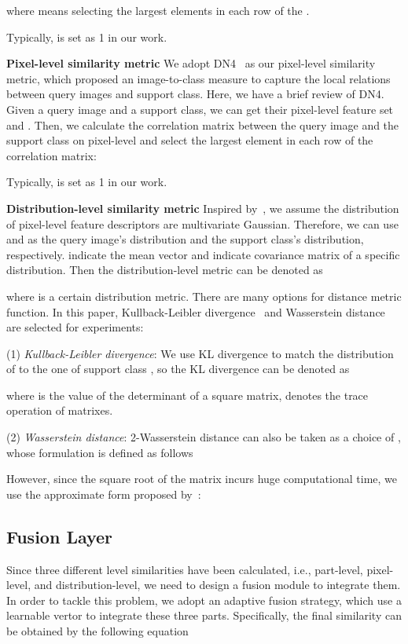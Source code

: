 \documentclass[10pt,twocolumn,letterpaper]{article}
\begin{document}
where  means selecting the  largest elements in each row of the .

Typically,  is set as 1 in our work.

\textbf{Pixel-level similarity metric}
We adopt DN4~\cite{li2019revisiting} as our pixel-level similarity metric, which proposed an image-to-class measure to capture the local relations between query images and support class. Here, we have a brief review of DN4. Given a query image and a support class, we can get their pixel-level feature set  and . Then, we calculate the correlation matrix   between the query image and the support class on pixel-level and select the  largest element in each row of the correlation matrix:

Typically,  is set as 1 in our work.

\textbf{Distribution-level similarity metric}
Inspired by~\cite{li2019distribution,ADM}, we assume the distribution of pixel-level feature descriptors are multivariate Gaussian. Therefore, we can use  and  as the query image's distribution and the support class's distribution, respectively.
 indicate the mean vector and  indicate covariance matrix of a specific distribution. Then the distribution-level metric can be denoted as

where  is a certain distribution metric. There are many options for distance metric function. In this paper, Kullback-Leibler divergence~\cite{Kullback51klDivergence} and Wasserstein distance are selected for experiments:

(1) \emph{Kullback-Leibler divergence}:
We use KL divergence to match the distribution of  to the one of support class , so the KL divergence can be denoted as

where  is the value of the determinant of a square matrix,   denotes the trace operation of matrixes.

(2) \emph{Wasserstein distance}: 2-Wasserstein distance can also be taken as a choice of , whose formulation is defined as follows

However, since the square root of the matrix incurs huge computational time, we use the approximate form proposed by~\cite{pamiHeWST19}:





\subsection{Fusion Layer}
Since three different level similarities have been calculated, i.e., part-level, pixel-level, and distribution-level, we need to design a fusion module to integrate them.
In order to tackle this problem, we adopt an adaptive fusion strategy, which use a learnable vertor 
to integrate these three parts. Specifically, the final similarity can be obtained by the following equation
\end{document}
